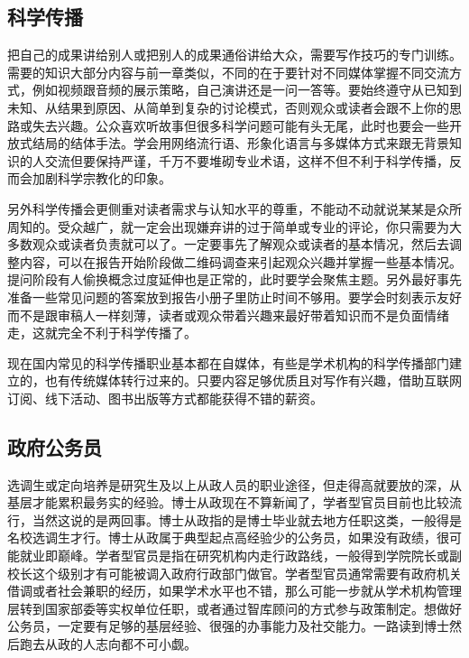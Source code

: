 \documentclass[]{tufte-book}
\begin{document}
\hypertarget{ux79d1ux5b66ux4f20ux64ad}{%
\subsection{科学传播}\label{ux79d1ux5b66ux4f20ux64ad}}

把自己的成果讲给别人或把别人的成果通俗讲给大众，需要写作技巧的专门训练。需要的知识大部分内容与前一章类似，不同的在于要针对不同媒体掌握不同交流方式，例如视频跟音频的展示策略，自己演讲还是一问一答等。要始终遵守从已知到未知、从结果到原因、从简单到复杂的讨论模式，否则观众或读者会跟不上你的思路或失去兴趣。公众喜欢听故事但很多科学问题可能有头无尾，此时也要会一些开放式结局的结体手法。学会用网络流行语、形象化语言与多媒体方式来跟无背景知识的人交流但要保持严谨，千万不要堆砌专业术语，这样不但不利于科学传播，反而会加剧科学宗教化的印象。

另外科学传播会更侧重对读者需求与认知水平的尊重，不能动不动就说某某是众所周知的。受众越广，就一定会出现嫌弃讲的过于简单或专业的评论，你只需要为大多数观众或读者负责就可以了。一定要事先了解观众或读者的基本情况，然后去调整内容，可以在报告开始阶段做二维码调查来引起观众兴趣并掌握一些基本情况。提问阶段有人偷换概念过度延伸也是正常的，此时要学会聚焦主题。另外最好事先准备一些常见问题的答案放到报告小册子里防止时间不够用。要学会时刻表示友好而不是跟审稿人一样刻薄，读者或观众带着兴趣来最好带着知识而不是负面情绪走，这就完全不利于科学传播了。

现在国内常见的科学传播职业基本都在自媒体，有些是学术机构的科学传播部门建立的，也有传统媒体转行过来的。只要内容足够优质且对写作有兴趣，借助互联网订阅、线下活动、图书出版等方式都能获得不错的薪资。

\hypertarget{ux653fux5e9cux516cux52a1ux5458}{%
\subsection{政府公务员}\label{ux653fux5e9cux516cux52a1ux5458}}

选调生或定向培养是研究生及以上从政人员的职业途径，但走得高就要放的深，从基层才能累积最务实的经验。博士从政现在不算新闻了，学者型官员目前也比较流行，当然这说的是两回事。博士从政指的是博士毕业就去地方任职这类，一般得是名校选调生才行。博士从政属于典型起点高经验少的公务员，如果没有政绩，很可能就业即巅峰。学者型官员是指在研究机构内走行政路线，一般得到学院院长或副校长这个级别才有可能被调入政府行政部门做官。学者型官员通常需要有政府机关借调或者社会兼职的经历，如果学术水平也不错，那么可能一步就从学术机构管理层转到国家部委等实权单位任职，或者通过智库顾问的方式参与政策制定。想做好公务员，一定要有足够的基层经验、很强的办事能力及社交能力。一路读到博士然后跑去从政的人志向都不可小觑。
\end{document}
